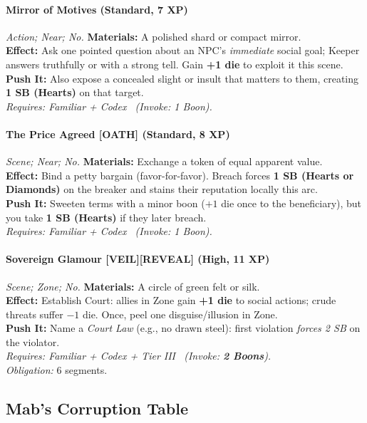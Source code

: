 \paragraph{Mirror of Motives (Standard, 7 XP)} \emph{Action; Near; No.}
\textbf{Materials:} A polished shard or compact mirror.\\
\textbf{Effect:} Ask one pointed question about an NPC’s \emph{immediate} social goal; Keeper answers truthfully or with a strong tell. Gain \textbf{+1 die} to exploit it this scene.\\
\textbf{Push It:} Also expose a concealed slight or insult that matters to them, creating \textbf{1 SB (Hearts)} on that target.\\
\emph{Requires: Familiar + Codex \ (\textit{Invoke:} 1 Boon).}

\paragraph{The Price Agreed \textnormal{[OATH]} (Standard, 8 XP)} \emph{Scene; Near; No.}
\textbf{Materials:} Exchange a token of equal apparent value.\\
\textbf{Effect:} Bind a petty bargain (favor-for-favor). Breach forces \textbf{1 SB (Hearts or Diamonds)} on the breaker and stains their reputation locally this arc.\\
\textbf{Push It:} Sweeten terms with a minor boon (\(+1\) die once to the beneficiary), but you take \textbf{1 SB (Hearts)} if they later breach.\\
\emph{Requires: Familiar + Codex \ (\textit{Invoke:} 1 Boon).}

\paragraph{Sovereign Glamour \textnormal{[VEIL][REVEAL]} (High, 11 XP)} \emph{Scene; Zone; No.}
\textbf{Materials:} A circle of green felt or silk.\\
\textbf{Effect:} Establish Court: allies in Zone gain \textbf{+1 die} to social actions; crude threats suffer \(-1\) die. Once, peel one disguise/illusion in Zone.\\
\textbf{Push It:} Name a \emph{Court Law} (e.g., no drawn steel): first violation \emph{forces 2 SB} on the violator.\\
\emph{Requires: Familiar + Codex + Tier III \ (\textit{Invoke:} \textbf{2 Boons}).}\\
\emph{Obligation:} 6 segments.

\subsection*{Mab's Corruption Table}
\label{sec:mab-corruption}

